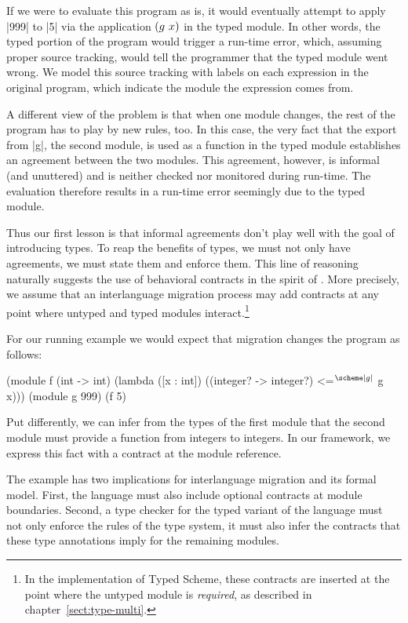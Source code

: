 \begin{schemeregion}
If we were to evaluate this program as is, it would eventually attempt
to apply \scheme|999| to \scheme|5| via the application $(g\ x)$ in the
  typed module. In other words, the typed portion of the program would
  trigger a run-time error, which, assuming proper source tracking,
  would tell the programmer that the typed module went wrong.  We
  model this source tracking with labels on each expression in the
  original program, which indicate the module the expression comes
  from.  

A different view of the problem is that when one module changes, the
rest of the program has to play by new rules, too. In this case, the
very fact that the export from \scheme|g|, the second module, is used as
a function in the typed module establishes an agreement between the
two modules. This agreement, however, is informal (and unuttered) and
is neither checked nor monitored during run-time. The evaluation
therefore results in a run-time 
error seemingly due to the typed module.

Thus our first lesson is that informal agreements don't play well with the
goal of introducing types. To reap the benefits of types, we must not
only have agreements, we must state them and enforce them. This line
of reasoning naturally suggests the use of behavioral contracts in the
spirit of \citet{ff:ho-contracts}. More precisely, we assume that an
interlanguage migration process may add contracts at any point where
untyped and typed modules interact.\footnote{In the implementation of
  Typed Scheme, these contracts are inserted at the point where the
  untyped module is \emph{required}, as described in
  chapter~\ref{sect:type-multi}.}

For our running example we would expect that migration changes the program
 as follows: 
\begin{exmp}
\begin{schemedisplay}
(module f (int -> int)
  (lambda ([x : int])
    ({(integer? -> integer?) <=$^{\scheme|g|}$ g} x)))
(module g 999)
(f 5)
\end{schemedisplay}
\label{ex:dlsone-res}
\end{exmp}
Put differently, we can infer from the types of the first module that
 the second module must provide a function from integers to
 integers. In our framework, we express this fact with a contract at
 the module reference.

The example has two implications for interlanguage migration and
 its formal model. First, the language must also include optional
 contracts at module boundaries. Second, a type checker for the typed
 variant of the language must not only enforce the rules of the type
 system, it must also infer the contracts that these type annotations
 imply for the remaining modules.


\end{schemeregion}
